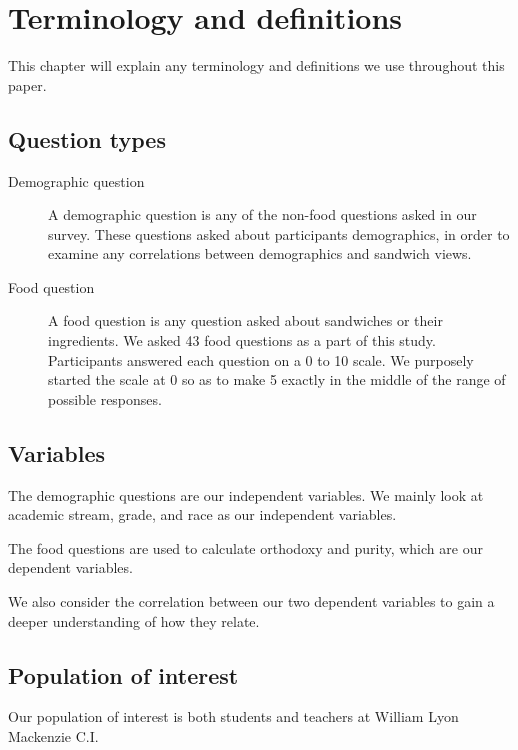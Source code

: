 \chapter{Terminology and definitions}

This chapter will explain any terminology and definitions we use throughout this paper.

\section{Question types}
\begin{description}
	\item[Demographic question] A demographic question is any of the non-food questions asked in our survey. These questions asked about participants demographics, in order to examine any correlations between demographics and sandwich views.
	\item[Food question] A food question is any question asked about sandwiches or their ingredients. We asked 43 food questions as a part of this study. Participants answered each question on a 0 to 10 scale. We purposely started the scale at 0 so as to make 5 exactly in the middle of the range of possible responses.
\end{description}

\section{Variables}
The demographic questions are our independent variables.
We mainly look at academic stream, grade, and race as our independent variables.

The food questions are used to calculate orthodoxy and purity, which are our dependent variables.

We also consider the correlation between our two dependent variables to gain a deeper understanding of how they relate.

\section{Population of interest}
Our population of interest is both students and teachers at William Lyon Mackenzie C.I.
